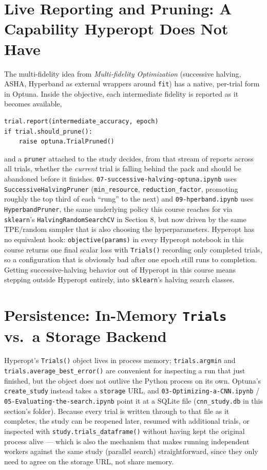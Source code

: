 \documentclass[conference]{IEEEtran}
\begin{document}
\section*{Live Reporting and Pruning: A Capability Hyperopt Does Not Have}
The multi-fidelity idea from \textit{Multi-fidelity Optimization} (successive halving, ASHA, Hyperband as external wrappers around \texttt{fit}) has a native, per-trial form in Optuna. Inside the objective, each intermediate fidelity is reported as it becomes available,
\begin{verbatim}
trial.report(intermediate_accuracy, epoch)
if trial.should_prune():
    raise optuna.TrialPruned()
\end{verbatim}
and a \texttt{pruner} attached to the study decides, from that stream of reports across all trials, whether the \emph{current} trial is falling behind the pack and should be abandoned before it finishes. \texttt{07-successive-halving-optuna.ipynb} uses \texttt{SuccessiveHalvingPruner} (\texttt{min\_resource}, \texttt{reduction\_factor}, promoting roughly the top third of each ``rung'' to the next) and \texttt{09-hperband.ipynb} uses \texttt{HyperbandPruner}, the same underlying policy this course reaches for via \texttt{sklearn}'s \texttt{HalvingRandomSearchCV} in Section 8, but now driven by the same TPE/random sampler that is also choosing the hyperparameters. Hyperopt has no equivalent hook: \texttt{objective(params)} in every Hyperopt notebook in this course returns one final scalar loss with \texttt{Trials()} recording only completed trials, so a configuration that is obviously bad after one epoch still runs to completion. Getting successive-halving behavior out of Hyperopt in this course means stepping outside Hyperopt entirely, into \texttt{sklearn}'s halving search classes.

\section*{Persistence: In-Memory \texttt{Trials} vs.\ a Storage Backend}
Hyperopt's \texttt{Trials()} object lives in process memory; \texttt{trials.argmin} and \texttt{trials.average\_best\_error()} are convenient for inspecting a run that just finished, but the object does not outlive the Python process on its own. Optuna's \texttt{create\_study} instead takes a \texttt{storage} URL, and \texttt{03-Optimizing-a-CNN.ipynb} / \texttt{05-Evaluating-the-search.ipynb} point it at a SQLite file (\texttt{cnn\_study.db} in this section's folder). Because every trial is written through to that file as it completes, the study can be reopened later, resumed with additional trials, or inspected with \texttt{study.trials\_dataframe()} without having kept the original process alive --- which is also the mechanism that makes running independent workers against the same study (parallel search) straightforward, since they only need to agree on the storage URL, not share memory.
\end{document}
